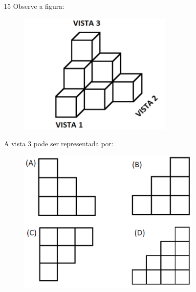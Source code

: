 

\num{15} Observe a figura:

\begin{figure}[h!]
\includegraphics[width=3.01693in,height=2.38354in]{./imgSAEB_6_MAT/media/image112.png}
\end{figure}

A vista $3$ pode ser representada por:

\begin{figure}[h!]
\includegraphics[width=3.59198in,height=2.82524in]{./imgSAEB_6_MAT/media/image113.png}
\end{figure}

